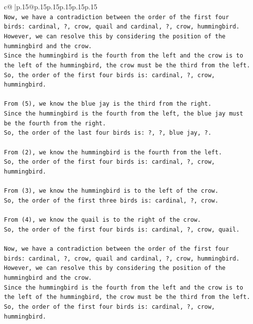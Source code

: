 \documentclass{article}
\begin{document}
{\begin{supertabular}{c@{$\;$}|p{.15\linewidth}@{}p{.15\linewidth}p{.15\linewidth}p{.15\linewidth}p{.15\linewidth}p{.15\linewidth}}
{{{\\ 
\texttt{Now, we have a contradiction between the order of the first four birds: cardinal, ?, crow, quail and cardinal, ?, crow, hummingbird. } \\
\texttt{However, we can resolve this by considering the position of the hummingbird and the crow. } \\
\texttt{Since the hummingbird is the fourth from the left and the crow is to the left of the hummingbird, the crow must be the third from the left. } \\
\texttt{So, the order of the first four birds is: cardinal, ?, crow, hummingbird.} \\
\\ 
\texttt{From (5), we know the blue jay is the third from the right. } \\
\texttt{Since the hummingbird is the fourth from the left, the blue jay must be the fourth from the right. } \\
\texttt{So, the order of the last four birds is: ?, ?, blue jay, ?.} \\
\\ 
\texttt{From (2), we know the hummingbird is the fourth from the left. } \\
\texttt{So, the order of the first four birds is: cardinal, ?, crow, hummingbird.} \\
\\ 
\texttt{From (3), we know the hummingbird is to the left of the crow. } \\
\texttt{So, the order of the first three birds is: cardinal, ?, crow.} \\
\\ 
\texttt{From (4), we know the quail is to the right of the crow. } \\
\texttt{So, the order of the first four birds is: cardinal, ?, crow, quail.} \\
\\ 
\texttt{Now, we have a contradiction between the order of the first four birds: cardinal, ?, crow, quail and cardinal, ?, crow, hummingbird. } \\
\texttt{However, we can resolve this by considering the position of the hummingbird and the crow. } \\
\texttt{Since the hummingbird is the fourth from the left and the crow is to the left of the hummingbird, the crow must be the third from the left. } \\
\texttt{So, the order of the first four birds is: cardinal, ?, crow, hummingbird.} \\
}}}
\end{supertabular}}
\end{document}
